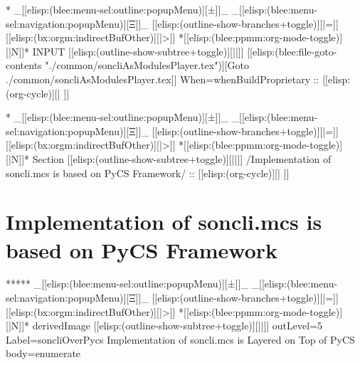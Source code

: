 \begin{whenOrg}
*  _[[elisp:(blee:menu-sel:outline:popupMenu)][±]]_ _[[elisp:(blee:menu-sel:navigation:popupMenu)][Ξ]]_ [[elisp:(outline-show-branches+toggle)][|=]] [[elisp:(bx:orgm:indirectBufOther)][|>]] *[[elisp:(blee:ppmm:org-mode-toggle)][|N]]*  INPUT      [[elisp:(outline-show-subtree+toggle)][||]]   [[elisp:(blee:file-goto-contents "./common/soncliAsModulesPlayer.tex")][Goto ./common/soncliAsModulesPlayer.tex]] When=whenBuildProprietary ::  [[elisp:(org-cycle)][| ]]
\end{whenOrg}
\begin{whenBuildProprietary}

\end{whenBuildProprietary}


\begin{whenOrg}
*  _[[elisp:(blee:menu-sel:outline:popupMenu)][±]]_ _[[elisp:(blee:menu-sel:navigation:popupMenu)][Ξ]]_ [[elisp:(outline-show-branches+toggle)][|=]] [[elisp:(bx:orgm:indirectBufOther)][|>]] *[[elisp:(blee:ppmm:org-mode-toggle)][|N]]*  Section    [[elisp:(outline-show-subtree+toggle)][||]]   /Implementation of soncli.mcs is based on PyCS Framework/ ::  [[elisp:(org-cycle)][| ]]
\end{whenOrg}

\section{Implementation of soncli.mcs is based on PyCS Framework}


\begin{whenOrg}
*****  _[[elisp:(blee:menu-sel:outline:popupMenu)][±]]_ _[[elisp:(blee:menu-sel:navigation:popupMenu)][Ξ]]_ [[elisp:(outline-show-branches+toggle)][|=]] [[elisp:(bx:orgm:indirectBufOther)][|>]] *[[elisp:(blee:ppmm:org-mode-toggle)][|N]]*  derivedImage [[elisp:(outline-show-subtree+toggle)][||]] outLevel=5 Label=soncliOverPycs Implementation of soncli.mcs is Layered on Top of PyCS body=enumerate

\end{whenOrg}

